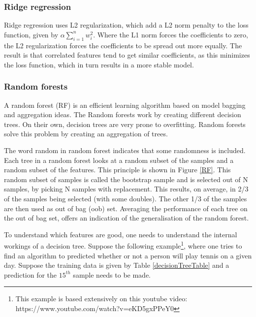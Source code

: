 \subsubsection{Ridge regression}
Ridge regression uses L2 regularization, which add a L2 norm penalty to the loss function, given by $\alpha\sum\limits_{i=1}^{n} w_i^2$. Where the L1 norm forces the coefficients to zero, the L2 regularization forces the coefficients to be spread out more equally. The result is that correlated features tend to get similar coefficients, as this minimizes the loss function, which in turn results in a more stable model. \\

\subsubsection{Random forests}
A random forest (RF)  is an efficient learning algorithm based on model bagging and aggregation ideas\citep{rfPaper}. The Random forests work by creating different decision trees. On their own, decision trees are very prone to overfitting. Random forests solve this problem by creating an aggregation of trees. 

\npar

The word random in random forest indicates that some randomness is included. Each tree in a random forest looks at a random subset of the samples and a random subset of the features. This principle is shown in Figure \ref{RF}. This random subset of samples is called the bootstrap sample and is selected out of N samples, by picking N samples with replacement. This results, on average, in 2/3 of the samples being selected (with some doubles). The other 1/3 of the samples are then used as out of bag (oob)  set. Averaging the performance of each tree on the out of bag set, offers an indication of the generalisation of the random forest.


To understand which features are good, one needs to understand the internal workings of a decision tree. Suppose the following example\footnote{This example is based extensively on this youtube video: https://www.youtube.com/watch?v=eKD5gxPPeY0}, where one tries to find an algorithm to predicted whether or not a person will play tennis on a given day. Suppose the training data is given by Table \ref{decisionTreeTable} and a prediction for the $15^{th}$ sample needs to be made.

